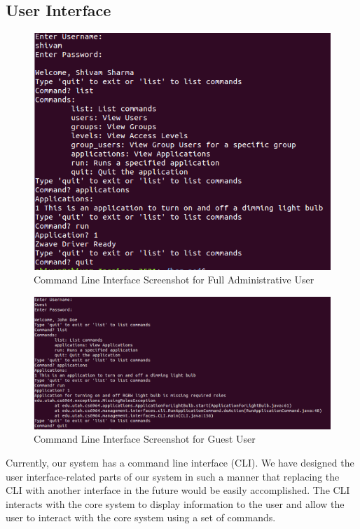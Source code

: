 \subsection{User Interface}
\label{sec:interface}
\begin{figure}[tbh]
    \centering
    \includegraphics[width=1.0\columnwidth]{figs/cli.png}
    \caption{Command Line Interface Screenshot for Full Administrative User}
    \label{Fig:cli}
\end{figure}
\begin{figure}[tbh]                                                             
    \centering
    \includegraphics[width=1.0\columnwidth]{figs/cli2.png}
    \caption{Command Line Interface Screenshot for Guest User}
    \label{Fig:cli2}
\end{figure}
Currently, our system has a command line interface (CLI). We have designed the
user interface-related parts of our system in such a manner that replacing the
CLI with another interface in the future would be easily accomplished. The CLI
interacts with the core system to display information to the user and allow the
user to interact with the core system using a set of commands.


